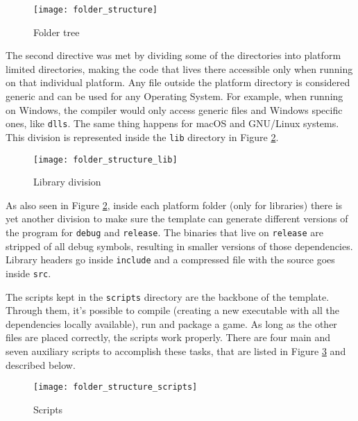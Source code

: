 \begin{figure}[h!]
\centering
\texttt{[image: folder\_structure]}
\caption{Folder tree}
\label{fig:folder_structure}
\end{figure}

The second directive was met by dividing some of the directories into platform limited directories, making the code that lives there accessible only when running on that individual platform. Any file outside the platform directory is considered generic and can be used for any Operating System. For example, when running on Windows, the compiler would only access generic files and Windows specific ones, like \texttt{dlls}. The same thing happens for macOS and GNU/Linux systems. This division is represented inside the \texttt{lib} directory in Figure \ref{fig:folder_structure_lib}.

\begin{figure}[h!]
\centering
\texttt{[image: folder\_structure\_lib]}
\caption{Library division}
\label{fig:folder_structure_lib}
\end{figure}

As also seen in Figure \ref{fig:folder_structure_lib}, inside each platform folder (only for libraries) there is yet another division to make sure the template can generate different versions of the program for \texttt{debug} and \texttt{release}. The binaries that live on \texttt{release} are stripped of all debug symbols, resulting in smaller versions of those dependencies. Library headers go inside \texttt{include} and a compressed file with the source goes inside \texttt{src}.


The scripts kept in the \texttt{scripts} directory are the backbone of the template. Through them, it's possible to compile (creating a new executable with all the dependencies locally available), run and package a game. As long as the other files are placed correctly, the scripts work properly. There are four main and seven auxiliary scripts to accomplish these tasks, that are listed in Figure \ref{fig:folder_structure_scripts} and described below.

\begin{figure}[h!]
\centering
\texttt{[image: folder\_structure\_scripts]}
\caption{Scripts}
\label{fig:folder_structure_scripts}
\end{figure}

